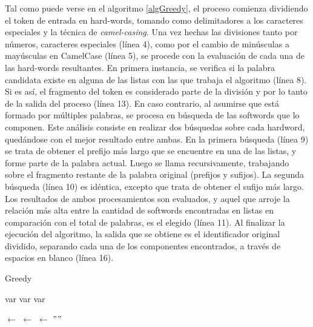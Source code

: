 Tal como puede verse en el algoritmo \ref{algGreedy}, el proceso comienza dividiendo el token de entrada en hard-words, tomando como delimitadores a los caracteres especiales y la técnica de \textit{camel-casing}.
Una vez hechas las divisiones tanto por números, caracteres especiales (línea 4), como por el cambio de minúsculas a mayúsculas en CamelCase (línea 5), se procede con la evaluación de cada una de las hard-words resultantes.
En primera instancia, se verifica si la palabra candidata existe en alguna de las listas con las que trabaja el algoritmo (línea 8).
Si es así, el fragmento del token es considerado parte de la división y por lo tanto de la salida del proceso (línea 13).
En caso contrario, al asumirse que está formado por múltiples palabras, se procesa en búsqueda de las softwords que lo componen.
Este análisis consiste en realizar dos búsquedas sobre cada hardword, quedándose con el mejor resultado entre ambas.
En la primera búsqueda (línea 9) se trata de obtener el prefijo más largo que se encuentre en una de las listas, y forme parte de la palabra actual.
Luego se llama recursivamente, trabajando sobre el fragmento restante de la palabra original (prefijos y sufijos).
La segunda búsqueda (línea 10) es idéntica, excepto que trata de obtener el sufijo más largo.
Los resultados de ambos procesamientos son evaluados, y aquel que arroje la relación más alta entre la cantidad de softwords encontradas en listas en comparación con el total de palabras, es el elegido (línea 11).
Al finalizar la ejecución del algoritmo, la salida que se obtiene es el identificador original dividido, separando cada una de los componentes encontrados, a través de espacios en blanco (línea 16).

\begin{algorithm}[H]
\caption{Greedy}
\label{algGreedy}
\DontPrintSemicolon
  
  
  
  \BlankLine
  var \Dictionary\;
  var \KnownAbbrs\;
  var \StopList\;
  
  \BlankLine
  \Token $\leftarrow$ \SplitChars\;
  \Token $\leftarrow$ \SplitLowerUpperCase\;
  \SplitToken $\leftarrow$ $""$\;
  
  \BlankLine
  \BlankLine
  \KwRet \SplitToken\;
\end{algorithm}

